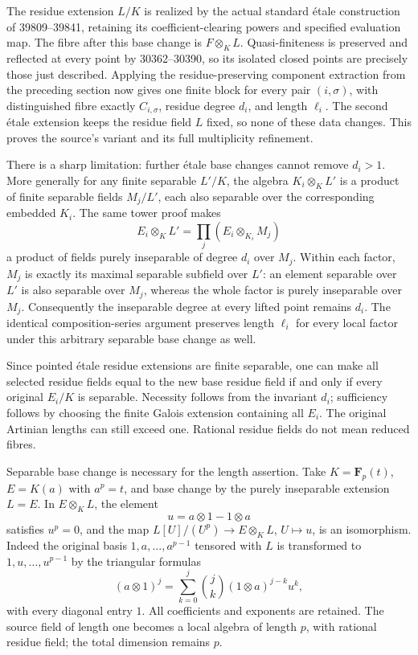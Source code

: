 The residue extension \(L/K\) is realized by the actual standard étale construction of 39809--39841, retaining its coefficient-clearing powers and specified evaluation map. The fibre after this base change is \(F\otimes_K L\). Quasi-finiteness is preserved and reflected at every point by 30362--30390, so its isolated closed points are precisely those just described. Applying the residue-preserving component extraction from the preceding section now gives one finite block for every pair \((i,\sigma)\), with distinguished fibre exactly \(C_{i,\sigma}\), residue degree \(d_i\), and length \(\ell_i\). The second étale extension keeps the residue field \(L\) fixed, so none of these data changes. This proves the source's variant and its full multiplicity refinement.

There is a sharp limitation: further étale base changes cannot remove \(d_i>1\). More generally for any finite separable \(L'/K\), the algebra \(K_i\otimes_K L'\) is a product of finite separable fields \(M_j/L'\), each also separable over the corresponding embedded \(K_i\). The same tower proof makes \[
E_i\otimes_K L'=
\prod_j(E_i\otimes_{K_i}M_j)
\] a product of fields purely inseparable of degree \(d_i\) over \(M_j\). Within each factor, \(M_j\) is exactly its maximal separable subfield over \(L'\): an element separable over \(L'\) is also separable over \(M_j\), whereas the whole factor is purely inseparable over \(M_j\). Consequently the inseparable degree at every lifted point remains \(d_i\). The identical composition-series argument preserves length \(\ell_i\) for every local factor under this arbitrary separable base change as well.

Since pointed étale residue extensions are finite separable, one can make all selected residue fields equal to the new base residue field if and only if every original \(E_i/K\) is separable. Necessity follows from the invariant \(d_i\); sufficiency follows by choosing the finite Galois extension containing all \(E_i\). The original Artinian lengths can still exceed one. Rational residue fields do not mean reduced fibres.

Separable base change is necessary for the length assertion. Take \(K=\mathbf F_p(t)\), \(E=K(a)\) with \(a^p=t\), and base change by the purely inseparable extension \(L=E\). In \(E\otimes_K L\), the element \[
u=a\otimes1-1\otimes a
\] satisfies \(u^p=0\), and the map \(L[U]/(U^p)\to E\otimes_K L\), \(U\mapsto u\), is an isomorphism. Indeed the original basis \(1,a,\ldots,a^{p-1}\) tensored with \(L\) is transformed to \(1,u,\ldots,u^{p-1}\) by the triangular formulas \[
(a\otimes1)^j=
\sum_{k=0}^{j}\binom{j}{k}(1\otimes a)^{j-k}u^k,
\] with every diagonal entry \(1\). All coefficients and exponents are retained. The source field of length one becomes a local algebra of length \(p\), with rational residue field; the total dimension remains \(p\).

